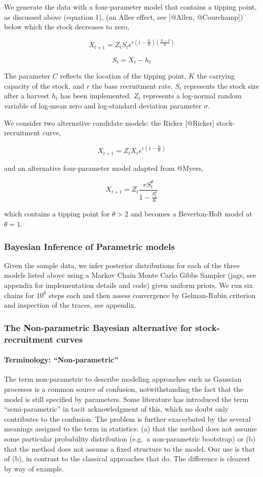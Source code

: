 \documentclass[author-year, review]{elsarticle} %
\begin{document}
We generate the data with a four-parameter model that contains a tipping
point, as discussed above (equation 1), (an Allee effect, see {[}@Allen,
@Courchamp{]}) below which the stock decreases to zero,

\[ X_{t+1} = Z_t S_t e^{r \left(1 - \frac{S_t}{K}\right)\left(\frac{S_t - \theta}{K}\right)} \]

\[ S_t = X_t - h_t \]

The parameter $C$ reflects the location of the tipping point, $K$ the
carrying capacity of the stock, and $r$ the base recruitment rate. $S_t$
represents the stock size after a harvest $h_t$ has been implemented.
$Z_t$ represents a log-normal random variable of log-mean zero and
log-standard deviation parameter $\sigma$.

We consider two alternative candidate models: the Ricker {[}@Ricker{]}
stock-recruitment curve,

\[X_{t+1} = Z_t X_t e^{r \left(1 - \frac{S_t}{K} \right) } \]

and an alternative four-parameter model adapted from @Myers,

\[ X_{t+1} = Z_t \frac{r S_t^{\theta}}{1 - \frac{S_t^\theta}{K}} \]

which contains a tipping point for $\theta > 2$ and becomes a
Beverton-Holt model at $\theta = 1$.

\subsubsection{Bayesian Inference of Parametric models}

Given the sample data, we infer posterior distributions for each of the
three models listed above using a Markov Chain Monte Carlo Gibbs Sampler
(jags, see appendix for implementation details and code) given uniform
priors. We run six chains for $10^6$ steps each and then assess
convergence by Gelman-Rubin criterion and inspection of the traces, see
appendix.

\subsubsection{The Non-parametric Bayesian alternative for
stock-recruitment curves}

\paragraph{Terminology: ``Non-parametric''}

The term non-parametric to describe modeling approaches such as Gaussian
processes is a common source of confusion, notwithstanding the fact that
the model is still specified by parameters. Some literature has
introduced the term ``semi-parametric'' in tacit acknowledgment of this,
which no doubt only contributes to the confusion. The problem is further
exacerbated by the several meanings assigned to the term in statistics:
(a) that the method does not assume some particular probability
distribution (e.g.~a non-parametric bootstrap) or (b) that the method
does not assume a fixed structure to the model. Our use is that of (b),
in contrast to the classical approaches that do. The difference is
clearest by way of example.
\end{document}
